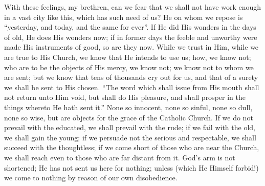 With these feelings, my brethren, can we fear that we shall not
have work enough in a vast city like this, which has such need of us?
He on whom we repose is ``yesterday, and today, and the same for
ever''. If He did His wonders in the days of old, He does His
wonders now; if in former days the feeble and unworthy were made His
instruments of good, so are they now. While we trust in Him, while we
are true to His Church, we know that He intends to use us; how, we
know not; who are to be the objects of His mercy, we know not; we know
not to whom we are sent; but we know that tens of thousands cry out
for us, and that of a surety we shall be sent to His chosen. ``The
word which shall issue from His mouth shall not return unto Him void,
but shall do His pleasure, and shall prosper in the things whereto He
hath sent it.'' None so innocent, none so sinful, none so dull,
none so wise, but are objects for the grace of the Catholic Church.
If
we do not prevail with the educated, we shall prevail with the rude;
if we fail with the old, we shall gain the young; if we persuade not
the serious and respectable, we shall succeed with the thoughtless; if
we come short of those who are near the Church, we shall reach even to
those who are far distant from it. God's arm is not shortened; He has
not sent us here for nothing; unless (which He Himself forbid!) we
come to nothing by reason of our own disobedience.

